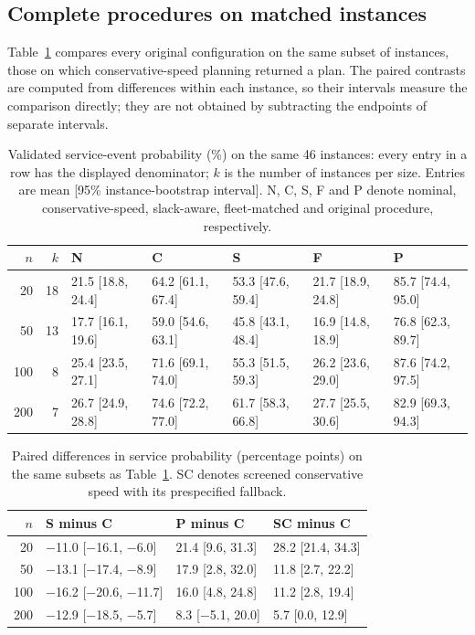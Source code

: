 \subsection{Complete procedures on matched instances}

Table~\ref{tab:matched} compares every original configuration on the same subset of instances, those on which conservative-speed planning returned a plan. The paired contrasts are computed from differences within each instance, so their intervals measure the comparison directly; they are not obtained by subtracting the endpoints of separate intervals.

\begin{table}[htbp]
\centering
\scriptsize
\caption{Validated service-event probability (\%) on the same 46 instances: every entry in a row has the displayed denominator; $k$ is the number of instances per size. Entries are mean [95\% instance-bootstrap interval]. N, C, S, F and P denote nominal, conservative-speed, slack-aware, fleet-matched and original procedure, respectively.}
\label{tab:matched}
\begin{tabular}{rrlllll}
\toprule
$n$ & $k$ & N & C & S & F & P\\
\midrule
20 & 18 & 21.5 [18.8, 24.4] & 64.2 [61.1, 67.4] & 53.3 [47.6, 59.4] & 21.7 [18.9, 24.8] & 85.7 [74.4, 95.0]\\
50 & 13 & 17.7 [16.1, 19.6] & 59.0 [54.6, 63.1] & 45.8 [43.1, 48.4] & 16.9 [14.8, 18.9] & 76.8 [62.3, 89.7]\\
100 & 8 & 25.4 [23.5, 27.1] & 71.6 [69.1, 74.0] & 55.3 [51.5, 59.3] & 26.2 [23.6, 29.0] & 87.6 [74.2, 97.5]\\
200 & 7 & 26.7 [24.9, 28.8] & 74.6 [72.2, 77.0] & 61.7 [58.3, 66.8] & 27.7 [25.5, 30.6] & 82.9 [69.3, 94.3]\\
\bottomrule
\end{tabular}
\end{table}


\begin{table}[htbp]
\centering
\small
\caption{Paired differences in service probability (percentage points) on the same subsets as Table~\ref{tab:matched}. SC denotes screened conservative speed with its prespecified fallback.}
\label{tab:paired}
\begin{tabular}{rlll}
\toprule
$n$ & S minus C & P minus C & SC minus C\\
\midrule
20 & $-$11.0 [$-$16.1, $-$6.0] & 21.4 [9.6, 31.3] & 28.2 [21.4, 34.3]\\
50 & $-$13.1 [$-$17.4, $-$8.9] & 17.9 [2.8, 32.0] & 11.8 [2.7, 22.2]\\
100 & $-$16.2 [$-$20.6, $-$11.7] & 16.0 [4.8, 24.8] & 11.2 [2.8, 19.4]\\
200 & $-$12.9 [$-$18.5, $-$5.7] & 8.3 [$-$5.1, 20.0] & 5.7 [0.0, 12.9]\\
\bottomrule
\end{tabular}
\end{table}


